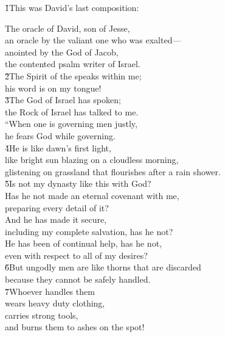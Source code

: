 \v{1}This was David's last composition:

\begin{poetry}
\poeml The oracle of David, son of Jesse, \\
\poemll    an oracle by the valiant one who was exalted--- \\
\poeml anointed by the God of Jacob, \\
\poemll    the contented psalm writer of Israel. \\
\poeml \v{2}The Spirit of the  speaks within me; \\
\poemll    his word is on my tongue! \\
\poeml \v{3}The God of Israel has spoken; \\
\poemll    the Rock of Israel has talked to me. \\
\poeml ``When one is governing men justly, \\
\poemll    he fears God while governing. \\
\poeml \v{4}He is like dawn's first light, \\
\poemll    like bright sun blazing on a cloudless morning, \\
\poemlll       glistening on grassland that flourishes after a rain shower. \\
\poeml \v{5}Is not my dynasty like this with God? \\
\poemll    Has he not made an eternal covenant with me, \\
\poemlll       preparing every detail of it? \\
\poeml And he has made it secure, \\
\poemll    including my complete salvation, has he not? \\
\poeml He has been of continual help, has he not, \\
\poemll    even with respect to all of my desires? \\
\poeml \v{6}But ungodly men are like thorns that are discarded \\
\poemll    because they cannot be safely handled. \\
\poeml \v{7}Whoever handles them \\
\poemll    wears heavy duty clothing, \\
\poeml carries strong tools, \\
\poemll    and burns them to ashes on the spot!
\end{poetry}

